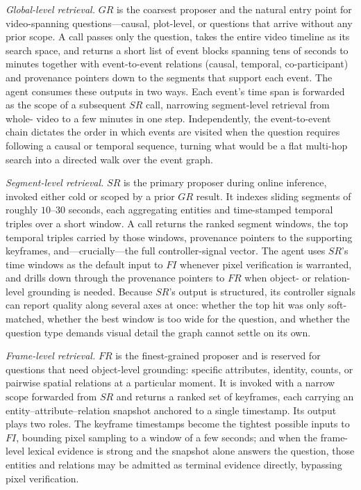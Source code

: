 \documentclass[sigconf, screen, review, anonymous]{acmart}
\begin{document}
\begin{sloppypar}
\emph{Global-level retrieval.}\quad
$GR$ is the coarsest proposer and the natural entry point for
video-spanning questions---causal, plot-level, or questions that arrive
without any prior scope.  A call passes only the question, takes the entire
video timeline as its search space, and returns a short list of event
blocks spanning tens of seconds to minutes together with event-to-event
relations (causal, temporal, co-participant) and provenance pointers down
to the segments that support each event.  The agent consumes these outputs
in two ways.  Each event's time span is forwarded as the $\mathrm{scope}$
of a subsequent $SR$ call, narrowing segment-level retrieval from whole-
video to a few minutes in one step.  Independently, the event-to-event
chain dictates the order in which events are visited when the question
requires following a causal or temporal sequence, turning what would be a
flat multi-hop search into a directed walk over the event graph.

\emph{Segment-level retrieval.}\quad
$SR$ is the primary proposer during online inference, invoked either cold
or scoped by a prior $GR$ result.  It indexes sliding segments of roughly
$10$--$30$ seconds, each aggregating entities and time-stamped temporal
triples over a short window.  A call returns the ranked segment windows,
the top temporal triples carried by those windows, provenance pointers to
the supporting keyframes, and---crucially---the full controller-signal
vector.  The agent uses $SR$'s time windows as the default input to $FI$
whenever pixel verification is warranted, and drills down through the
provenance pointers to $FR$ when object- or relation-level grounding is
needed.  Because $SR$'s output is structured, its controller signals can
report quality along several axes at once: whether the top hit was only
soft-matched, whether the best window is too wide for the question, and
whether the question type demands visual detail the graph cannot settle on
its own.

\emph{Frame-level retrieval.}\quad
$FR$ is the finest-grained proposer and is reserved for questions that
need object-level grounding: specific attributes, identity, counts, or
pairwise spatial relations at a particular moment.  It is invoked with a
narrow $\mathrm{scope}$ forwarded from $SR$ and returns a ranked set of
keyframes, each carrying an entity--attribute--relation snapshot anchored
to a single timestamp.  Its output plays two roles.  The keyframe
timestamps become the tightest possible inputs to $FI$, bounding pixel
sampling to a window of a few seconds; and when the frame-level lexical
evidence is strong and the snapshot alone answers the question, those
entities and relations may be admitted as terminal evidence directly,
bypassing pixel verification.


\end{sloppypar}
\end{document}
